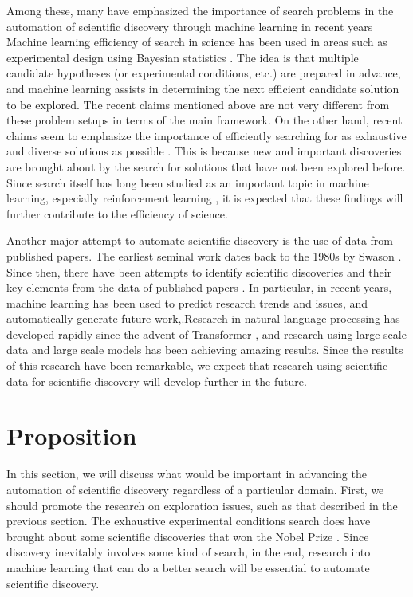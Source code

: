 \documentclass{article}
\begin{document}
Among these, many have emphasized the importance of search problems in the automation of scientific discovery through machine learning in recent years \cite{coley2020autonomous1,kitano2021nobel,bengio2022ml4sci,lavin2021simulation} Machine learning efficiency of search in science has been used in areas such as experimental design using Bayesian statistics \cite{chaloner1995bayesian,shahriari2015taking}. The idea is that multiple candidate hypotheses (or experimental conditions, etc.) are prepared in advance, and machine learning assists in determining the next efficient candidate solution to be explored. The recent claims mentioned above are not very different from these problem setups in terms of the main framework. On the other hand, recent claims seem to emphasize the importance of efficiently searching for as exhaustive and diverse solutions as possible \cite{kitano2021nobel,bengio2022ml4sci,bengio2021flow,lavin2021simulation}. This is because new and important discoveries are brought about by the search for solutions that have not been explored before. Since search itself has long been studied as an important topic in machine learning, especially reinforcement learning \cite{amin2021survey}, it is expected that these findings will further contribute to the efficiency of science.

Another major attempt to automate scientific discovery is the use of data from published papers. The earliest seminal work dates back to the 1980s by Swason \cite{swanson1986fish}. Since then, there have been attempts to identify scientific discoveries and their key elements from the data of published papers \cite{fortunato2018science,agarwal2009can,donthu2021conduct}. In particular, in recent years, machine learning has been used to predict research trends and issues\cite{lahav2022search,hope2020scisight}, and automatically generate future work,\cite{wang2019paperrobot}.Research in natural language processing has developed rapidly since the advent of Transformer \cite{vaswani2017attention}, and research using large scale data and large scale models has been \cite{brown2020language,bommasani2021opportunities} achieving amazing results. Since the results of this research have been remarkable, we expect that research using scientific data for scientific discovery will develop further in the future.

\section{Proposition}
In this section, we will discuss what would be important in advancing the automation of scientific discovery regardless of a particular domain. First, we should promote the research on exploration issues, such as that described in the previous section. The exhaustive experimental conditions search does have brought about some scientific discoveries that won the Nobel Prize \cite{kitano2021nobel}. Since discovery inevitably involves some kind of search, in the end, research into machine learning that can do a better search will be essential to automate scientific discovery.
\end{document}
